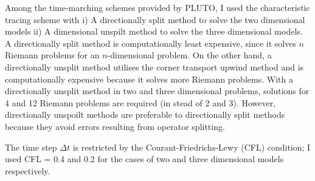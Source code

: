 Among the time-marching schemes provided by PLUTO, I used the characteristic tracing scheme with i) A directionally split method to solve the two dimensional models  ii) A dimensional unspilt method to solve the three dimensional models. A directionally split method is computationally least expensive, since it solves $n$ Riemann problems for an $n$-dimensional problem. On the other hand, a directionally unsplit method utilises the corner transport upwind method \citep{colella90} and is computationally expensive because it solves more Riemann problems. With a directionally unsplit method in two and three dimensional problems, solutions for 4 and 12 Riemann problems are required (in stead of 2 and 3). However, directionally unspoilt methods are preferable to directionally split methods because they avoid errors resulting from operator splitting. 

The time step $\Delta t$ is restricted by the Courant-Friedrichs-Lewy (CFL) condition;  
I used CFL = 0.4 and 0.2 for the cases of two and three dimensional models respectively. 

